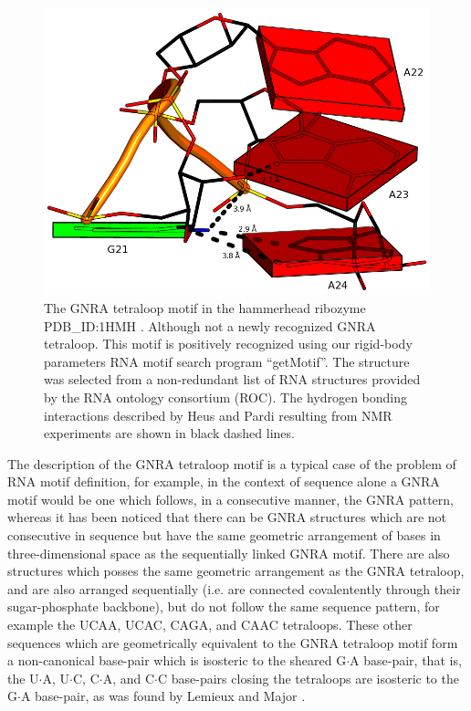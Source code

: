 \begin{figure}
\centering
\includegraphics[angle=0, scale=0.38]{Chapter5/gnra21L2.png}
\caption{The   GNRA  tetraloop  motif   in  the   hammerhead  ribozyme
  PDB\_ID:1HMH \cite{pley1994}.  Although  not a newly recognized GNRA
  tetraloop. This motif is  positively recognized using our rigid-body
  parameters RNA motif search  program ``getMotif''. The structure was
  selected from a non-redundant list of RNA structures provided by the
  RNA  ontology consortium (ROC).   The hydrogen  bonding interactions
  described  by  Heus and  Pardi  \cite{heus1991}  resulting from  NMR
  experiments are shown in black dashed lines.}
\label{fig:gnrablocks}
\end{figure}

The description of  the GNRA tetraloop motif is a  typical case of the
problem  of RNA  motif  definition,  for example,  in  the context  of
sequence  alone  a  GNRA  motif  would  be one  which  follows,  in  a
consecutive manner, the GNRA pattern, whereas it has been noticed that
there can be GNRA structures which are not consecutive in sequence but
have  the same  geometric  arrangement of  bases in  three-dimensional
space  as  the  sequentially   linked  GNRA  motif.   There  are  also
structures  which posses the  same geometric  arrangement as  the GNRA
tetraloop,  and are  also arranged  sequentially (i.e.   are connected
covalentently  through  their sugar-phosphate  backbone),  but do  not
follow the  same sequence pattern,  for example the UCAA,  UCAC, CAGA,
and  CAAC tetraloops\cite{lemieux2006}.   These other  sequences which
are  geometrically  equivalent to  the  GNRA  tetraloop  motif form  a
non-canonical base-pair  which is  isosteric to the  sheared G$\cdot$A
base-pair, that is, the U$\cdot$A, U$\cdot$C, C$\cdot$A, and C$\cdot$C
base-pairs  closing  the tetraloops  are  isosteric  to the  G$\cdot$A
base-pair, as was found by Lemieux and Major \cite{lemieux2006}.

